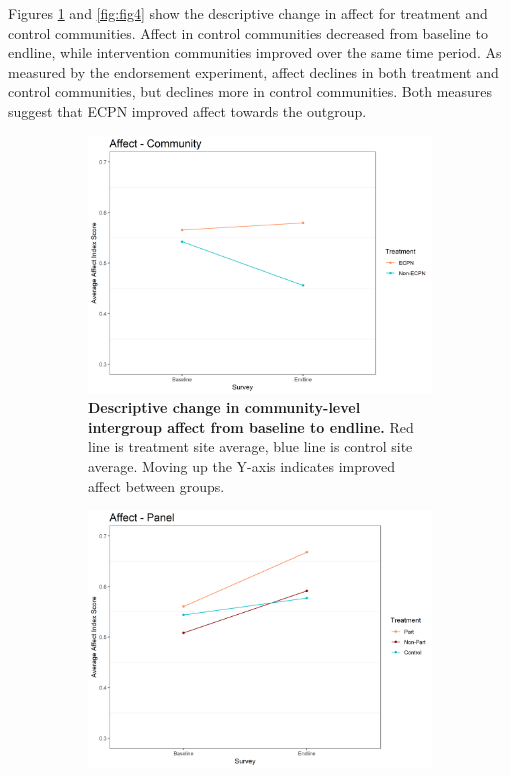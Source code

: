 \documentclass[11pt]{article}
\begin{document}
Figures \ref{fig:fig3} and \ref{fig:fig4} show the descriptive change in
affect for treatment and control communities. Affect in control
communities decreased from baseline to endline, while intervention
communities improved over the same time period. As measured by the
endorsement experiment, affect declines in both treatment and control
communities, but declines more in control communities. Both measures
suggest that ECPN improved affect towards the outgroup.

\begin{figure}[H]
    \begin{subfigure}[b]{.48\textwidth}
    \centering
        \includegraphics[width=\linewidth]{../../../figs/affectComm_plot.png}
        \caption{\textbf{Descriptive change in community-level intergroup affect from baseline to endline.} Red line is treatment site average, blue line is control site average.  Moving up the Y-axis indicates improved affect between groups.}
        \label{fig:fig3}
    \end{subfigure}
    \hfill
    \begin{subfigure}[b]{.48\textwidth}
    \centering
        \includegraphics[width=\linewidth]{../../../figs/affectPan_plot.png}

\end{subfigure}
\end{figure}
\end{document}
